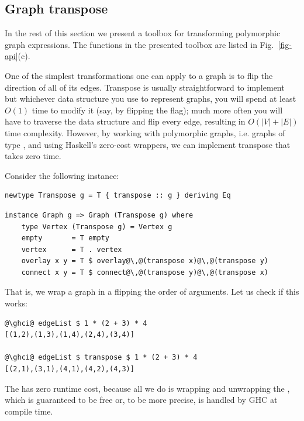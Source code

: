 \subsection{Graph transpose}

In the rest of this section we present a toolbox for transforming polymorphic graph
expressions. The functions in the presented toolbox are listed in Fig.~\ref{fig-api}(c).

One of the simplest transformations one can apply to a graph is to flip the
direction of all of its edges. Transpose is usually straightforward to implement but
whichever data structure you use to represent graphs, you will spend at least
$O(1)$ time to modify it (say, by flipping the  flag);
much more often you will have to traverse the data structure and flip every edge,
resulting in $O(|V|+|E|)$ time complexity. However, by working with polymorphic
graphs, i.e. graphs of type , and using Haskell's
zero-cost  wrappers, we can implement transpose that takes zero time.

Consider the following  instance:

\begin{verbatim}
newtype Transpose g = T { transpose :: g } deriving Eq
\end{verbatim}
\vspace{1mm}
\begin{verbatim}
instance Graph g => Graph (Transpose g) where
    type Vertex (Transpose g) = Vertex g
    empty       = T empty
    vertex      = T . vertex
    overlay x y = T $ overlay@\,@(transpose x)@\,@(transpose y)
    connect x y = T $ connect@\,@(transpose y)@\,@(transpose x)
\end{verbatim}

\noindent
That is, we wrap a graph in a  flipping the order of  arguments.
Let us check if this works:

\begin{verbatim}
@\ghci@ edgeList $ 1 * (2 + 3) * 4
[(1,2),(1,3),(1,4),(2,4),(3,4)]

@\ghci@ edgeList $ transpose $ 1 * (2 + 3) * 4
[(2,1),(3,1),(4,1),(4,2),(4,3)]
\end{verbatim}

The  has zero runtime cost, because all we do is wrapping and unwrapping
the , which is guaranteed to be free or, to be more precise, is handled
by GHC at compile time.

